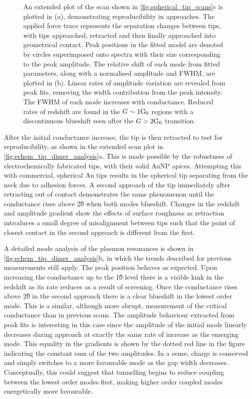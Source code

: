 \documentclass[a4paper, 11pt]{article}
\begin{document}
\begin{figure}[bt]
{An extended plot of the  scan shown in \autoref{fig:spherical_tip_scans}c is plotted in (a), demonstrating reproducibility in approaches. The applied force trace represents the separation changes between tips, with tips approached, retracted and then finally approached into geometrical contact. Peak positions in the fitted model are denoted by circles superimposed onto spectra with their size corresponding to the peak amplitude. The relative shift of each mode from fitted parameters, along with a normalised amplitude and FWHM, are plotted in (b). Linear rates of amplitude variation are revealed from peak fits, removing the width contribution from the peak intensity. The FWHM of each mode increases with conductance. Reduced rates of redshift are found in the $G\sim1\mathrm{G_{0}}$ regions with a discontinuous blueshift seen after the $G>2\mathrm{G_{0}}$ transition.}
\label{fig:echem_tip_dimer_analysis}
\end{figure}

After the initial conductance increase, the tip is then retracted to test for reproducibility, as shown in the extended scan plot in \autoref{fig:echem_tip_dimer_analysis}a. This is made possible by the robustness of electrochemically fabricated tips, with their solid AuNP apices. Attempting this with commercial, spherical Au tips results in the spherical tip separating from the neck due to adhesion forces. A second approach of the tip immediately after retracting out of contact demonstrates the same phenomenon until the conductance rises above 2\G0 when both modes blueshift. Changes in the redshift and amplitude gradient show the effects of surface roughness as retraction introduces a small degree of misalignment between tips such that the point of closest contact in the second approach is different from the first.

A detailed mode analysis of the plasmon resonances is shown in \autoref{fig:echem_tip_dimer_analysis}b, in which the trends described for previous measurements still apply. The peak position behaves as expected. Upon increasing the conductance up to the 1\G0 level there is a visible kink in the redshift as its rate reduces as a result of screening. Once the conductance rises above 2\G0 in the second approach there is a clear blueshift in the lowest order mode. This is a similar, although more abrupt, measurement of the critical conductance than in previous scans. The amplitude behaviour extracted from peak fits is interesting in this case since the amplitude of the initial mode linearly decreases during approach at exactly the same rate of increase as the emerging mode. This equality in the gradients is shown by the dotted red line in the figure indicating the constant sum of the two amplitudes. In a sense, charge is conserved and simply switches to a more favourable mode as the gap width decreases. Conceptually, this could suggest that tunnelling begins to reduce coupling between the lowest order modes first, making higher order coupled modes energetically more favourable.
\end{document}
